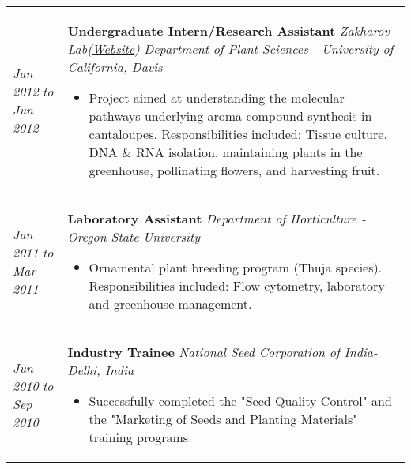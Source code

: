 \documentclass[a4paper]{article}
\begin{document}
\begin{tabular}{p{3cm} p{14cm}}

\vspace{0pt} 
\textit{Jan 2012}\newline
\textit{to}\newline
\textit{Jun 2012}\newline
&
\vspace{0pt}

\textbf{Undergraduate Intern/Research Assistant}\newline
\textit{Zakharov Lab(\href{http://www.plantsciences.ucdavis.edu/faculty/zakharov/}{Website})}\newline
\textit{Department of Plant Sciences - University of California, Davis}
\begin{itemize}[noitemsep,topsep=0pt]
  \item Project aimed at understanding the molecular pathways underlying aroma compound synthesis in cantaloupes. Responsibilities included: Tissue culture, DNA \& RNA isolation, maintaining plants in the greenhouse, pollinating flowers, and harvesting fruit.
\end{itemize}
%
\\
%
\vspace{0pt} 
\textit{Jan 2011}\newline
\textit{to}\newline
\textit{Mar 2011}\newline
&
\vspace{0pt}
\textbf{Laboratory Assistant}\newline
\textit{Department of Horticulture - Oregon State University}
\begin{itemize}[noitemsep,topsep=0pt]
  \item Ornamental plant breeding program (Thuja species). Responsibilities included: Flow cytometry, laboratory and greenhouse management.
\end{itemize}
%
\\
%
\vspace{0pt} 
\textit{Jun 2010}\newline
\textit{to}\newline
\textit{Sep 2010}\newline
&
\vspace{0pt}
\textbf{Industry Trainee}\newline
\textit{National Seed Corporation of India- Delhi, India}
\begin{itemize}[noitemsep,topsep=0pt]
  \item Successfully completed the "Seed Quality Control" and the "Marketing of Seeds and Planting Materials" training programs.

\end{itemize}
\end{tabular}
\end{document}
